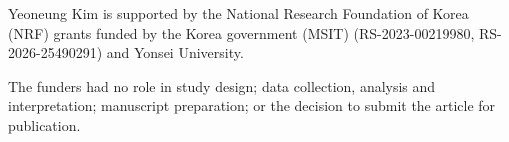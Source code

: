Yeoneung Kim is supported by the National Research Foundation of Korea (NRF)
grants funded by the Korea government (MSIT) (RS-2023-00219980,
RS-2026-25490291) and Yonsei University.

The funders had no role in study design; data collection, analysis and
interpretation; manuscript preparation; or the decision to submit the article
for publication.
